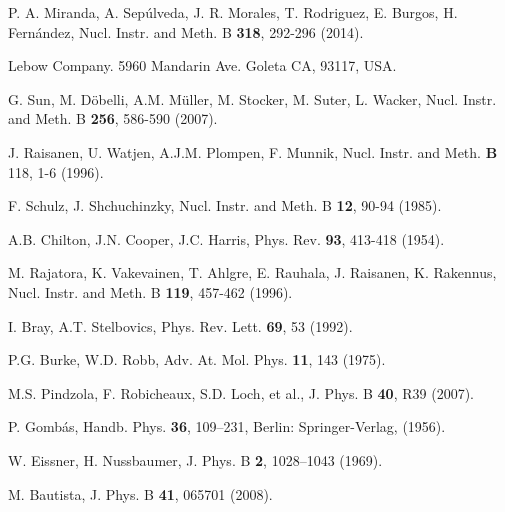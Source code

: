 \begin{thebibliography}{9}
\begin{comment}
\bibitem{zenodo} 
C.C. Montanari \textit{et al.} DOI: 10.5281/zenodo.3678785 
\end{comment}
P. A. Miranda, A. Sep\'ulveda, J. R. Morales, T. Rodriguez, E. Burgos, 
H. Fern\'andez,
Nucl. Instr. and Meth. B \textbf{318}, 292-296  (2014).

Lebow Company. 5960 Mandarin Ave. Goleta CA, 93117, USA.

G. Sun, M. D\"{o}belli, A.M. M\"{u}ller, M. Stocker, M. Suter, L. Wacker, 
Nucl. Instr. and Meth. B \textbf{256}, 586-590 (2007).

J. Raisanen, U. Watjen, A.J.M. Plompen, F. Munnik, 
Nucl. Instr. and Meth. \textbf{B} 118, 1-6  (1996).

F. Schulz, J. Shchuchinzky, 
Nucl. Instr. and Meth. B \textbf{12},  90-94 (1985).

A.B. Chilton, J.N. Cooper, J.C. Harris, 
Phys. Rev. \textbf{93}, 413-418  (1954).

M. Rajatora, K. Vakevainen, T. Ahlgre, E. Rauhala, J. Raisanen, K. Rakennus, 
Nucl. Instr. and Meth. B \textbf{119}, 457-462 (1996).




I. Bray, A.T. Stelbovics, 
Phys. Rev. Lett. \textbf{69}, 53 (1992).

P.G. Burke, W.D. Robb, 
Adv. At. Mol. Phys. \textbf{11}, 143 (1975).

M.S. Pindzola, F. Robicheaux, S.D. Loch, et al., 
J. Phys. B \textbf{40}, R39 (2007).

P. Gombás, 
Handb. Phys. \textbf{36}, 109--231, Berlin: Springer-Verlag, (1956).

W. Eissner, H. Nussbaumer,
J. Phys. B \textbf{2}, 1028--1043 (1969).

M. Bautista,
J. Phys. B \textbf{41}, 065701 (2008).


\end{thebibliography}
